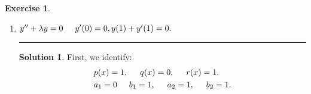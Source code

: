 \documentclass{book}
\theoremstyle{definition}
\newtheorem*{exer*}{Exercise}
\newtheorem*{sln*}{Solution}
\begin{document}
\begin{exer*}
\begin{enumerate}
		\newpage
		
		
		\item $y'' + \lambda y = 0\hspace{0.5cm} y'(0) = 0, y(1) + y'(1) = 0. $\\
		\noindent\rule{\textwidth}{0.5pt}
		\begin{sln*}
			First, we identify:
			\begin{align*}
			&p(x) = 1,\hspace{0.5cm} q(x) = 0,\hspace{0.5cm} r(x) = 1.\\
			&a_1 = 0\hspace{0.5cm} b_1 = 1,\hspace{0.5cm}a_2 = 1,\hspace{0.5cm} b_2 = 1.
			\end{align*}
			

\end{sln*}
\end{enumerate}
\end{exer*}
\end{document}
